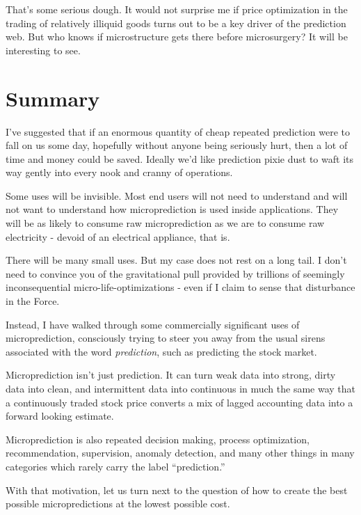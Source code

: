 That's some serious dough. It would not surprise me if price optimization in the trading of relatively illiquid goods turns out to be a key driver of the prediction web. But who knows if microstructure gets there before microsurgery? It will be interesting to see. 


\section{Summary}
\label{sec:uses_summary}

I've suggested that if an enormous quantity of cheap repeated prediction were to fall on us some day, hopefully without anyone being seriously hurt, then a lot of time and money could be saved. Ideally we'd like prediction pixie dust to waft its way gently into every nook and cranny of operations.   

Some uses will be invisible. Most end users will not need to understand and will not want to understand how microprediction is used inside applications.  They will be as likely to consume raw microprediction as we are to consume raw electricity - devoid of an electrical appliance, that is. 

There will be many small uses. But my case does not rest on a long tail. I don't need to convince you of the gravitational pull provided by trillions of seemingly inconsequential micro-life-optimizations - even if I claim to sense that disturbance in the Force. 

Instead, I have walked through some commercially significant uses of microprediction, consciously trying to steer you away from the usual sirens associated with the word {\em prediction}, such as predicting the stock market.

Microprediction isn't just prediction. It can turn weak data into strong, dirty data into clean, and intermittent data into continuous in much the same way that a continuously traded stock price converts a mix of lagged accounting data into a forward looking estimate. 

Microprediction is also repeated decision making, process optimization, recommendation,  supervision, anomaly detection, and many other things in many categories which rarely carry the label ``prediction.'' 

With that motivation, let us turn next to the question of how to create the best possible micropredictions at the lowest possible cost. 

 



